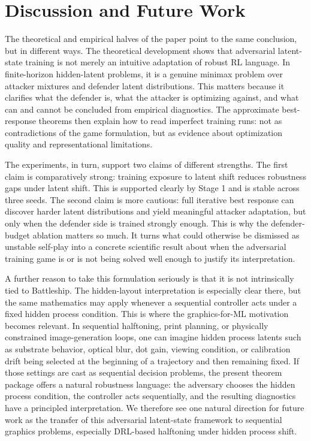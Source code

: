 \documentclass[11pt]{article}
\begin{document}
\section{Discussion and Future Work}

The theoretical and empirical halves of the paper point to the same conclusion, but in different ways. The theoretical development shows that adversarial latent-state training is not merely an intuitive adaptation of robust RL language. In finite-horizon hidden-latent problems, it is a genuine minimax problem over attacker mixtures and defender latent distributions. This matters because it clarifies what the defender is, what the attacker is optimizing against, and what can and cannot be concluded from empirical diagnostics. The approximate best-response theorems then explain how to read imperfect training runs: not as contradictions of the game formulation, but as evidence about optimization quality and representational limitations.

The experiments, in turn, support two claims of different strengths. The first claim is comparatively strong: training exposure to latent shift reduces robustness gaps under latent shift. This is supported clearly by Stage 1 and is stable across three seeds. The second claim is more cautious: full iterative best response can discover harder latent distributions and yield meaningful attacker adaptation, but only when the defender side is trained strongly enough. This is why the defender-budget ablation matters so much. It turns what could otherwise be dismissed as unstable self-play into a concrete scientific result about when the adversarial training game is or is not being solved well enough to justify its interpretation.

A further reason to take this formulation seriously is that it is not intrinsically tied to Battleship. The hidden-layout interpretation is especially clear there, but the same mathematics may apply whenever a sequential controller acts under a fixed hidden process condition. This is where the graphics-for-ML motivation becomes relevant. In sequential halftoning, print planning, or physically constrained image-generation loops, one can imagine hidden process latents such as substrate behavior, optical blur, dot gain, viewing condition, or calibration drift being selected at the beginning of a trajectory and then remaining fixed. If those settings are cast as sequential decision problems, the present theorem package offers a natural robustness language: the adversary chooses the hidden process condition, the controller acts sequentially, and the resulting diagnostics have a principled interpretation. We therefore see one natural direction for future work as the transfer of this adversarial latent-state framework to sequential graphics problems, especially DRL-based halftoning under hidden process shift.
\end{document}
